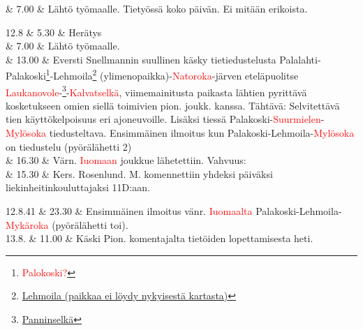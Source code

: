 \documentclass[11pt,a5paper,oneside]{book}
\begin{document}
& 7.00 & Lähtö työmaalle. \newline Tietyössä koko päivän. \newline Ei mitään erikoista. \\

\taulustop


12.8 & 5.30 & Herätys \\

& 7.00 & Lähtö työmaalle. \\

& 13.00 & Eversti Snellmannin suullinen käsky tietiedustelusta Palalahti-Palakoski\footnote{\textcolor{red}{Palokoski?}}-Lehmoila\footnote{\href{https://www.google.fi/maps/place/61\%C2\%B021'43.9\%22N+32\%C2\%B029'59.3\%22E/}{Lehmoila (paikkaa ei löydy nykyisestä kartasta)}} (ylimenopaikka)-\textcolor{red}{Natoroka}-järven eteläpuolitse \textcolor{red}{Laukanovole}-\footnote{\href{https://www.google.fi/maps/place/61\%C2\%B023'52.2\%22N+32\%C2\%B046'25.9\%22E/@61.397831,32.7716833,901m/}{Panninselkä}}-\textcolor{red}{Kalvatselkä}, viimemainitusta paikasta lähtien pyrittävä kosketukseen omien siellä toimivien pion. joukk. kanssa. Tähtävä: Selvitettävä tien käyttökelpoisuus eri ajoneuvoille. Lisäksi tiessä Palakoski-\textcolor{red}{Suurmielen}-\textcolor{red}{Mylösoka} tiedusteltava. \newline Ensimmäinen ilmoitus kun Palakoski-Lehmoila-\textcolor{red}{Mylösoka} on tiedustelu (pyörälähetti 2) \\

& 16.30 & Värn. \textcolor{red}{Iuomaan} joukkue lähetettiin. Vahvuus: \newline \\

& 15.30 & Kers. Rosenlund. M. komennettiin yhdeksi päiväksi liekinheitinkouluttajaksi 11D:aan. \\
\newpage

12.8.41 & 23.30 & Ensimmäinen ilmoitus vänr. \textcolor{red}{Iuomaalta} Palakoski-Lehmoila-\textcolor{red}{Mykäroka} (pyörälähetti toi). \newline\newline\newline\newline\newline \\

13.8. & 11.00 & Käski Pion. komentajalta tietöiden lopettamisesta heti. \newline \\
\end{document}
